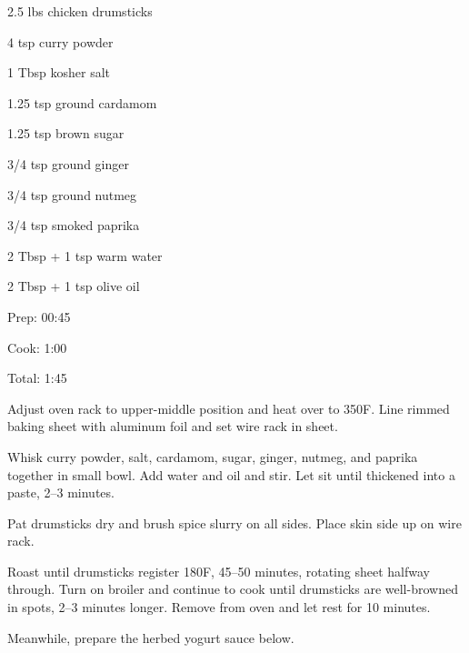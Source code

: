 \documentclass[oneside]{book}  %
\newcommand{\degF}{\textdegree F\xspace}
\begin{document}
\begin{IT}
  \begin{ingredients}
    \item[2.5 lbs] chicken drumsticks
    \item[4 tsp] curry powder
    \item[1 Tbsp] kosher salt
    \item[1.25 tsp] ground cardamom
    \item[1.25 tsp] brown sugar
    \item[3/4 tsp] ground ginger
    \item[3/4 tsp] ground nutmeg
    \item[3/4 tsp] smoked paprika
    \item[2 Tbsp + 1 tsp] warm water
    \item[2 Tbsp + 1 tsp] olive oil
  \end{ingredients}

  \switchcolumn

  \begin{timeline}
    \item[Prep:]  00:45
    \item[Cook:]  1:00
    \item[Total:] 1:45
  \end{timeline}
\end{IT}

\begin{directions}
  \item Adjust oven rack to upper-middle position and heat over to 350\degF.
    Line rimmed baking sheet with aluminum foil and set wire rack in sheet.

  \item Whisk curry powder, salt, cardamom, sugar, ginger, nutmeg, and paprika
    together in small bowl. Add water and oil and stir. Let sit until thickened
    into a paste, 2--3 minutes.

  \item Pat drumsticks dry and brush spice slurry on all sides. Place skin side
    up on wire rack.

  \columnbreak

  \item Roast until drumsticks register 180\degF, 45--50 minutes, rotating
    sheet halfway through. Turn on broiler and continue to cook until drumsticks
    are well-browned in spots, 2--3 minutes longer. Remove from oven and let
    rest for 10 minutes.

  \item Meanwhile, prepare the herbed yogurt sauce below.
\end{directions}
\end{document}
